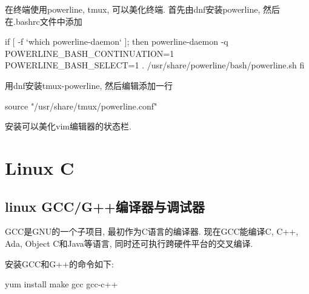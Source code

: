 在终端使用powerline, tmux, 可以美化终端. 首先由dnf安装powerline, 
然后在.bashrc文件中添加
\begin{shell}
if [ -f `which powerline-daemon` ]; then
  powerline-daemon -q
  POWERLINE_BASH_CONTINUATION=1
  POWERLINE_BASH_SELECT=1
  . /usr/share/powerline/bash/powerline.sh
fi
\end{shell}
用dnf安装tmux-powerline, 然后编辑添加一行
\begin{shell}
 source "/usr/share/tmux/powerline.conf"
\end{shell}

安装可以美化vim编辑器的状态栏.

\section{Linux C}


\subsection{linux GCC/G++编译器与调试器}
GCC是GNU的一个子项目, 最初作为C语言的编译器. 现在GCC能编译C, 
C++, Ada, Object C和Java等语言, 同时还可执行跨硬件平台的交叉编译.

安装GCC和G++的命令如下:
\begin{shell}
 yum install make gcc gcc-c++
\end{shell}

